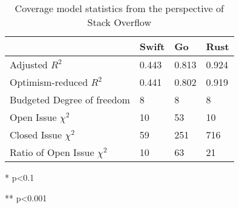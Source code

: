 \begin{table}
\centering

\caption{Coverage model statistics from the perspective of Stack Overflow}
\begin{threeparttable}
\begin{tabular}{|l|l|l|l|}
\hline
       & Swift & Go & Rust \\ \hline
    Adjusted $R^2$   &0.443  & 0.813 &0.924  \\ \hline
    Optimism-reduced $R^2$ & 0.441 &0.802  &0.919 \\ \hline
    Budgeted Degree of freedom & 8 & 8  &8 \\ \hline
    Open Issue $\chi^2$             & 10 \tnote{*} & 53\tnote{**} & 10\tnote{*}\\ \hline
    Closed Issue $\chi^2$           & 59 \tnote{*}& 251\tnote{**} & 716\tnote{**} \\ \hline
    Ratio of Open Issue $\chi^2$    & 10 \tnote{*} & 63\tnote{**} & 21\tnote{**}\\ \hline
\end{tabular}


\begin{tablenotes}
\item [*] p\textless 0.1 
\item [**] p\textless 0.001
\end{tablenotes}
\end{threeparttable}
\label{table:issue_question relationship}
\end{table}


